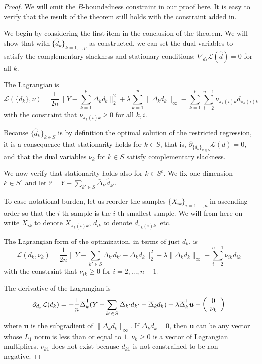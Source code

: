 \begin{proof} 
We will omit the $B$-boundedness constraint in our proof here. It is easy to verify that the result of the theorem still holds with the constraint added in. 



We begin by considering the first item in the conclusion of the theorem.
We will show that with $\{\hat{d}_k\}_{k=1,..,p}$ as constructed, we
can set the dual variables to satisfy the 
complementary slackness and stationary conditions: $\nabla_{d_k} \mathcal{L}(\hat{d})  = 0$ for all $k$. 

The Lagrangian is
\begin{equation}
\label{eqn:full_lagrange}
\mathcal{L}( \{ d_k \}, \nu) = 
  \frac{1}{2n} \Big\| 
    Y - \sum_{k=1}^p  \bar{\Delta}_k d_k  \Big\|_2^2 + 
    \lambda \sum_{k=1}^p \| \bar{\Delta}_k d_k \|_\infty -
    \sum_{k=1}^p \sum_{i=2}^{n-1} \nu_{\pi_k(i)k} d_{\pi_k(i)k} 
\end{equation}
with the constraint that $\nu_{\pi_k(i)k} \geq 0$ for all $k,i$.

Because $\{\hat{d}_k\}_{k \in S}$ is by definition the optimal solution of the restricted regression, it is a consequence that stationarity holds for $k \in S$, that is, $\partial_{ \{ d_k \}_{k \in S} } \mathcal{L}(d) = 0$, and that the dual variables $\nu_k$ for $k \in S$ satisfy complementary slackness.

We now verify that stationarity holds also for $k \in S^c$. We fix one dimension $k \in S^c$ and let $\hat{r} = Y - \sum_{k' \in S} \bar{\Delta}_{k'} \hat{d}_{k'}$. 

To ease notational burden, let us reorder the samples $\{X_{ik}\}_{i=1,...,n}$ in ascending order so that the $i$-th sample is the $i$-th smallest sample. We will from here on write $X_{ik}$ to denote $X_{\pi_k(i)k}$, $d_{ik}$ to denote $d_{\pi_k(i)k}$, etc.

The Lagrangian form of the optimization, in terms of just $d_k$, is
\[
\mathcal{L}(d_k, \nu_k) =
  \frac{1}{2n} \big\| Y - \sum_{k' \in S} \bar{\Delta}_{k'} d_{k'} 
  -  \bar{\Delta}_k d_k \big\|_2^2 
   + \lambda \| \bar{\Delta}_k d_k\|_\infty
  - \sum_{i=2}^{n-1} \nu_{ik} d_{ik}
\]
with the constraint that $\nu_{ik} \geq 0$ for $i=2,...,n-1$. 

The derivative of the Lagrangian is
\begin{align*}
\partial_{d_k} \mathcal{L}(d_k) =  -\frac{1}{n} \overline{\Delta}_k^{\mathsf{T}} ( Y - \sum_{k'\in S} \overline{\Delta}_{k'} d_{k'}  - \overline{\Delta}_k d_k )
        + \lambda \overline{\Delta}_k^{\mathsf{T}} \mbox{\boldmath $u$}
      - \left( \begin{array}{c} 0 \\ \nu_k \end{array} \right)
\end{align*}
where $\mathbf{u}$ is the subgradient of $\| \bar{\Delta}_k d_k \|_\infty$. If $\bar{\Delta}_k d_k = 0$, then $\mathbf{u}$ can be any vector whose $L_1$ norm is less than or equal to $1$. $\nu_k \geq 0$ is a vector of Lagrangian multipliers. $\nu_{k1}$ does not exist because $d_{k1}$ is not constrained to be non-negative.


\end{proof}
